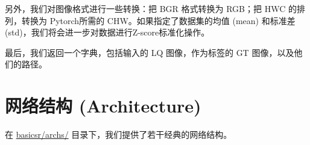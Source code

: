 \documentclass[../main.tex]{subfiles}
\begin{document}
    另外，我们对图像格式进行一些转换：把 BGR 格式转换为 RGB；把 HWC 的排列，转换为 Pytorch所需的 CHW。如果指定了数据集的均值 (mean) 和标准差 (std)，我们将会进一步对数据进行Z-score标准化操作。

    最后，我们返回一个字典，包括输入的 LQ 图像，作为标签的 GT 图像，以及他们的路径。


\section{网络结构 (Architecture)} \label{code_structure:arch}
    在 \href{https://github.com/XPixelGroup/BasicSR/tree/master/basicsr/archs}{basicsr/archs/} 目录下，我们提供了若干经典的网络结构。
\end{document}
